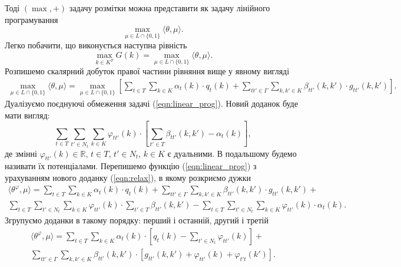 Тоді $(\max,+)$ задачу розмітки можна представити як задачу лінійного програмування
\begin{equation}
  \max\limits_{\mu\in L\cap \{0,1\}}\langle\theta,\mu\rangle.
\end{equation}
Легко побачити, що виконується наступна рівність
\begin{equation}
  \max_{k\in K^T} G(k) = \max\limits_{\mu\in L\cap \{0,1\}}\langle\theta,\mu\rangle.
\end{equation}
Розпишемо скалярний добуток правої частини рівняння вище у явному вигляді
\begin{equation}
  \label{eqn:linear_prog}
  \begin{aligned}
  \max\limits_{\mu\in L\cap \{0,1\}}\langle\theta,\mu\rangle = 
  \max\limits_{\mu\in L\cap \{0,1\}} \left[ \sum\limits_{t\in T}\sum\limits_{k\in K} \alpha_t(k)\cdot q_t(k) +
  \sum\limits_{tt'\in \Gamma}\sum\limits_{k,k'\in K} \beta_{tt'}(k,k')\cdot g_{tt'}(k,k') \right].
  \end{aligned}
\end{equation}
Дуалізуємо поєднуючі обмеження задачі (\ref{eqn:linear_prog}). Новий доданок буде 
мати вигляд:
\begin{equation}
  \label{eqn:relax}
  \sum\limits_{t\in T}\sum\limits_{t'\in N_t}\sum\limits_{k\in K} \varphi_{tt'}(k)\cdot \left[ \sum\limits_{t'\in T}\beta_{tt'}(k,k')-\alpha_t(k) \right],
\end{equation}
де змінні $\varphi_{tt'}(k)\in \mathbb{R}$, $t\in T$, $t'\in N_t$, $k\in K$ є дуальними. В подальшому будемо 
називати їх потенціалами.
Перепишемо функцію (\ref{eqn:linear_prog}) з урахуванням нового доданку (\ref{eqn:relax}), в якому
розкриємо дужки
\begin{equation}
  \begin{aligned}
  \langle\theta^{\varphi},\mu\rangle = \sum\limits_{t\in T}\sum\limits_{k\in K} \alpha_t(k)\cdot q_t(k)+
  \sum\limits_{tt'\in \Gamma}\sum\limits_{k,k'\in K} \beta_{tt'}(k,k')\cdot g_{tt'}(k,k')+\\
  \sum\limits_{t\in T}\sum\limits_{t'\in N_t}\sum\limits_{k\in K} \varphi_{tt'}(k)\cdot
  \sum\limits_{t'\in T}\beta_{tt'}(k,k') - \sum\limits_{t\in T}\sum\limits_{t'\in N_t}\sum\limits_{k\in K} \varphi_{tt'}(k)\cdot \alpha_t(k).
  \end{aligned}
\end{equation}
Згрупуємо доданки в такому порядку: перший і останній, другий і третій
\begin{equation}
  \label{eqn:reparam}
  \begin{aligned}
  \langle\theta^{\varphi},\mu\rangle = \sum\limits_{t\in T}\sum\limits_{k\in K} \alpha_t(k)\cdot \left[ q_t(k)- \sum\limits_{t'\in N_t} \varphi_{tt'}(k) \right]+\\
  \sum\limits_{tt'\in \Gamma}\sum\limits_{k,k'\in K} \beta_{tt'}(k,k')\cdot \left[g_{tt'}(k,k') + \varphi_{tt'}(k) + \varphi_{t't}(k') \right].
  \end{aligned}
\end{equation}

